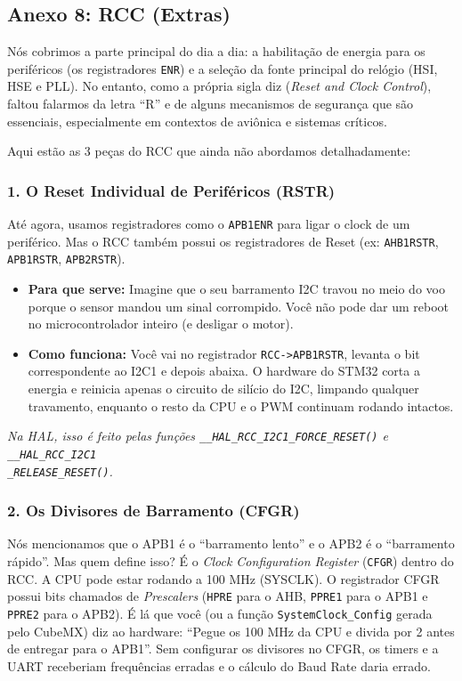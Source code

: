 \documentclass[12pt,a4paper]{article}
\begin{document}
\newpage
\subsection*{Anexo 8: RCC (Extras)}
\label{anexo:8}

Nós cobrimos a parte principal do dia a dia: a habilitação de energia para os periféricos (os registradores \texttt{ENR}) e a seleção da fonte principal do relógio (HSI, HSE e PLL). No entanto, como a própria sigla diz (\textit{Reset and Clock Control}), faltou falarmos da letra ``R'' e de alguns mecanismos de segurança que são essenciais, especialmente em contextos de aviônica e sistemas críticos.

Aqui estão as 3 peças do RCC que ainda não abordamos detalhadamente:

\subsubsection*{1. O Reset Individual de Periféricos (RSTR)}
Até agora, usamos registradores como o \texttt{APB1ENR} para ligar o clock de um periférico. Mas o RCC também possui os registradores de Reset (ex: \texttt{AHB1RSTR}, \texttt{APB1RSTR}, \texttt{APB2RSTR}).
\begin{itemize}
    \item \textbf{Para que serve:} Imagine que o seu barramento I2C travou no meio do voo porque o sensor mandou um sinal corrompido. Você não pode dar um reboot no microcontrolador inteiro (e desligar o motor).
    \item \textbf{Como funciona:} Você vai no registrador \texttt{RCC->APB1RSTR}, levanta o bit correspondente ao I2C1 e depois abaixa. O hardware do STM32 corta a energia e reinicia apenas o circuito de silício do I2C, limpando qualquer travamento, enquanto o resto da CPU e o PWM continuam rodando intactos.
\end{itemize}
\textit{Na HAL, isso é feito pelas funções \texttt{\_\_HAL\_RCC\_I2C1\_FORCE\_RESET()} e \texttt{\_\_HAL\_RCC\_I2C1\\\_RELEASE\_RESET()}.}

\subsubsection*{2. Os Divisores de Barramento (CFGR)}
Nós mencionamos que o APB1 é o ``barramento lento'' e o APB2 é o ``barramento rápido''. Mas quem define isso? É o \textit{Clock Configuration Register} (\texttt{CFGR}) dentro do RCC.
A CPU pode estar rodando a 100 MHz (SYSCLK). O registrador CFGR possui bits chamados de \textit{Prescalers} (\texttt{HPRE} para o AHB, \texttt{PPRE1} para o APB1 e \texttt{PPRE2} para o APB2).
É lá que você (ou a função \texttt{SystemClock\_Config} gerada pelo CubeMX) diz ao hardware: ``Pegue os 100 MHz da CPU e divida por 2 antes de entregar para o APB1''. Sem configurar os divisores no CFGR, os timers e a UART receberiam frequências erradas e o cálculo do Baud Rate daria errado.
\end{document}
